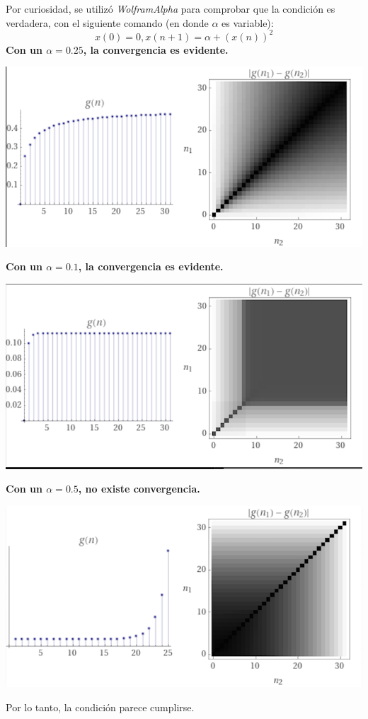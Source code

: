 \documentclass[a4paper,12pt]{article}
\begin{document}
Por curiosidad, se utilizó \textit{WolframAlpha} para comprobar que la condición es verdadera, con el siguiente comando (en donde $\alpha$ es variable): $$x(0)=0, x(n+1)=\alpha+(x(n))^2$$
\textbf{Con un $\alpha=0.25$, la convergencia es evidente.}
\begin{center}
    \includegraphics[scale=0.4]{Images/1.png}
\end{center}
\textbf{Con un $\alpha=0.1$, la convergencia es evidente.}
\begin{center}
    \includegraphics[scale=0.4]{Images/2.png}
\end{center}
\textbf{Con un $\alpha=0.5$, no existe convergencia.}
\begin{center}
    \includegraphics[scale=0.4]{Images/3.png}
\end{center}
Por lo tanto, la condición parece cumplirse.


\end{document}
